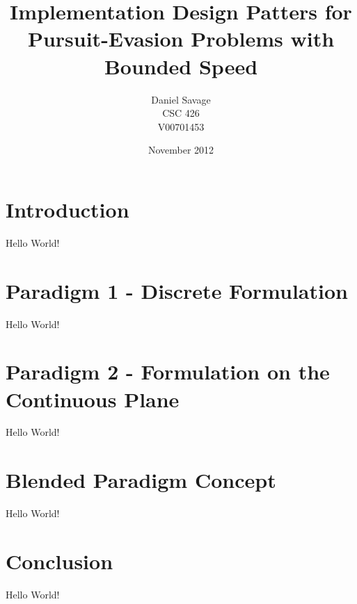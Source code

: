\documentclass{article}
\begin{document}
\title{Implementation Design Patters for Pursuit-Evasion Problems with Bounded Speed}
\author{Daniel Savage\\CSC 426\\{V00701453}}
\date{November 2012}
\maketitle
\pagebreak

\section{Introduction}
Hello World!

\section{Paradigm 1 - Discrete Formulation}
Hello World!

\section{Paradigm 2 - Formulation on the Continuous Plane}
Hello World!

\section{Blended Paradigm Concept}
Hello World!

\section{Conclusion}
Hello World!
\end{document}

